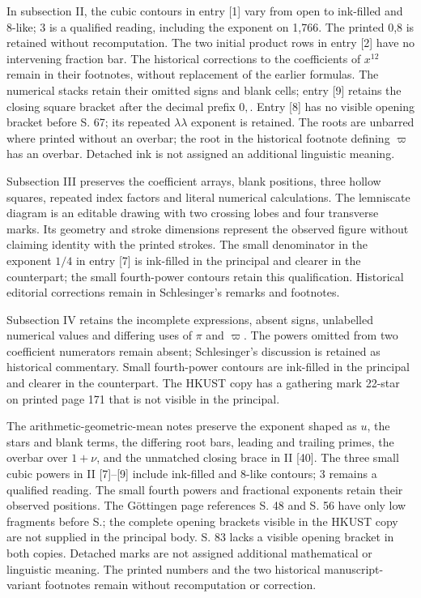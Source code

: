 In subsection II, the cubic contours in entry [1] vary from open to ink-filled and 8-like; 3 is a qualified reading, including the exponent on 1,766. The printed 0,8 is retained without recomputation. The two initial product rows in entry [2] have no intervening fraction bar. The historical corrections to the coefficients of $x^{12}$ remain in their footnotes, without replacement of the earlier formulas. The numerical stacks retain their omitted signs and blank cells; entry [9] retains the closing square bracket after the decimal prefix $0,$. Entry [8] has no visible opening bracket before S. 67; its repeated $\lambda\lambda$ exponent is retained. The roots are unbarred where printed without an overbar; the root in the historical footnote defining $\varpi$ has an overbar. Detached ink is not assigned an additional linguistic meaning.

Subsection III preserves the coefficient arrays, blank positions, three hollow squares, repeated index factors and literal numerical calculations. The lemniscate diagram is an editable drawing with two crossing lobes and four transverse marks. Its geometry and stroke dimensions represent the observed figure without claiming identity with the printed strokes. The small denominator in the exponent $1/4$ in entry [7] is ink-filled in the principal and clearer in the counterpart; the small fourth-power contours retain this qualification. Historical editorial corrections remain in Schlesinger’s remarks and footnotes.

Subsection IV retains the incomplete expressions, absent signs, unlabelled numerical values and differing uses of $\pi$ and $\varpi$. The powers omitted from two coefficient numerators remain absent; Schlesinger’s discussion is retained as historical commentary. Small fourth-power contours are ink-filled in the principal and clearer in the counterpart. The HKUST copy has a gathering mark 22-star on printed page 171 that is not visible in the principal.

The arithmetic-geometric-mean notes preserve the exponent shaped as $u$, the stars and blank terms, the differing root bars, leading and trailing primes, the overbar over $1+\nu$, and the unmatched closing brace in II [40]. The three small cubic powers in II [7]–[9] include ink-filled and 8-like contours; 3 remains a qualified reading. The small fourth powers and fractional exponents retain their observed positions. The Göttingen page references S. 48 and S. 56 have only low fragments before S.; the complete opening brackets visible in the HKUST copy are not supplied in the principal body. S. 83 lacks a visible opening bracket in both copies. Detached marks are not assigned additional mathematical or linguistic meaning. The printed numbers and the two historical manuscript-variant footnotes remain without recomputation or correction.

